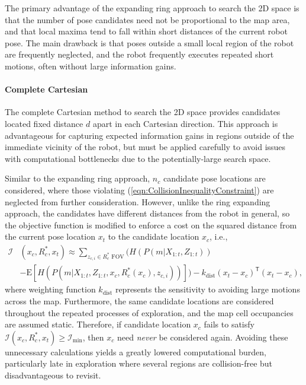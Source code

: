 \documentclass[smallextended]{svjour3}       %
\newcommand{\refeqn}[1]{(\ref{eqn:#1})}
\newcommand{\T}{\ensuremath{\mathsf{T}}}
\begin{document}
The primary advantage of the expanding ring approach to search the 2D space is that the number of pose candidates need not be proportional to the map area, and that local maxima tend to fall within short distances of the current robot pose. The main drawback is that poses outside a small local region of the robot are frequently neglected, and the robot frequently executes repeated short motions, often without large information gains.

\paragraph{Complete Cartesian}
The complete Cartesian method to search the 2D space provides candidates located fixed distance $d$ apart in each Cartesian direction. This approach is advantageous for capturing expected information gains in regions outside of the immediate vicinity of the robot, but must be applied carefully to avoid issues with computational bottlenecks due to the potentially-large search space.

Similar to the expanding ring approach, $n_c$ candidate pose locations are considered, where those violating \refeqn{CollisionInequalityConstraint} are neglected from further consideration. However, unlike the ring expanding approach, the candidates have different distances from the robot in general, so the objective function is modified to enforce a cost on the squared distance from the current pose location $x_t$ to the candidate location $x_c$, i.e.,
\begin{align}
\label{eqn:ObjFunApproxCompleteCartesian}
\mathcal I&(x_c,R_c^*,x_t)\approx \sum_{z_{c,i}\in R_{c}^*\text{ FOV}}\bigg(H(P(m|X_{1:t},Z_{1:t}))\nonumber\\&-\text{E}\left[H(P(m|X_{1:t},Z_{1:t},x_c,R_c^*(x_c),z_{c,i}))\right]\bigg)-k_\text{dist}(x_t-x_c)^\T(x_t-x_c),
\end{align}
where weighting function $k_\text{dist}$ represents the sensitivity to avoiding large motions across the map. Furthermore, the same candidate locations are considered throughout the repeated processes of exploration, and the map cell occupancies are assumed static. Therefore, if candidate location $x_c$ fails to satisfy $\mathcal I(x_c,R_c^*,x_t)\geq\mathcal I_\text{min}$, then $x_c$ need \emph{never} be considered again. Avoiding these unnecessary calculations yields a greatly lowered computational burden, particularly late in exploration where several regions are collision-free but disadvantageous to revisit.
\end{document}
